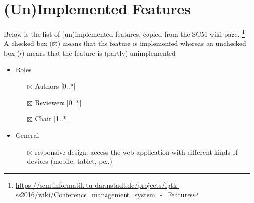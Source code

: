 \documentclass[nochapterpage,nopartpage,noheadingspace,numbersubsubsec,bigchapter,colorback,accentcolor=tud9c,10pt]{tudreport}
\begin{document}
    \clearpage

  \chapter{(Un)Implemented Features}
  \label{ch:appendix:features}

    Below is the list of (un)implemented features, copied from the SCM wiki page.%
    \footnote{\url{https://scm.informatik.tu-darmstadt.de/projects/iptk-ss2016/wiki/Conference_management_system_-_Features}}
    A checked box ($\boxtimes$) means that the feature is implemented whereas an unchecked box ($\square$) means that the feature is (partly) unimplemented
        \begin{itemize}
            \setlength\itemsep{0em}
            \item Roles
            \begin{itemize}
                \item[$\boxtimes$] Authors [0..*]
                \item[$\boxtimes$] Reviewers [0..*]
                \item[$\boxtimes$] Chair [1..*]
            \end{itemize}

            \item General
            \begin{itemize}
                \item[$\boxtimes$] responsive design: access the web application with different kinds of devices (mobile, tablet, pc..)
            \end{itemize}


\end{itemize}
\end{document}

